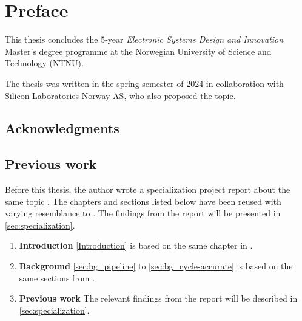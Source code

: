 \chapter*{Preface}


This thesis concludes the 5-year \textit{Electronic Systems Design and Innovation} Master's degree programme at the Norwegian University of Science and Technology (NTNU).  

The thesis was written in the spring semester of 2024 in collaboration with Silicon Laboratories Norway AS, who also proposed the topic.


\section*{Acknowledgments}


%
%
%


\section*{Previous work}

Before this thesis, the author wrote a specialization project report about the same topic \cite{torjenygaardeikenesDesigningRISCVReference2023}. The chapters and sections listed below have been reused with varying resemblance to \cite{torjenygaardeikenesDesigningRISCVReference2023}. The findings from the report will be presented in \cref{sec:specialization}.


\begin{enumerate}
    \item \textbf{Introduction} \cref{Introduction} is based on the same chapter in \cite{torjenygaardeikenesDesigningRISCVReference2023}.
    \item \textbf{Background} \cref{sec:bg_pipeline} to \cref{sec:bg_cycle-accurate} is based on the same sections from \cite{torjenygaardeikenesDesigningRISCVReference2023}.
    \item \textbf{Previous work} The relevant findings from the report will be described in \cref{sec:specialization}.
\end{enumerate}


